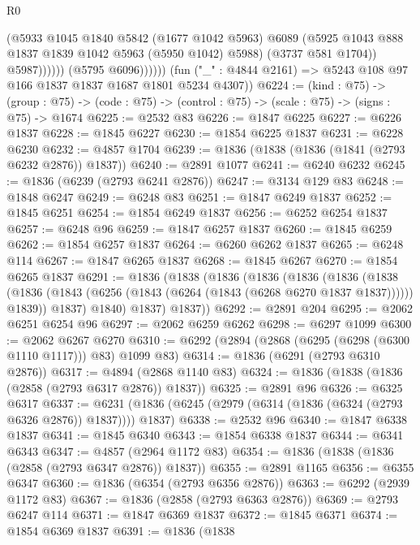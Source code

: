 \begin{lexlean}{R0}
\begin{coremodule}
                            (@5933
                              @1045
                              @1840
                              @5842
                              (@1677 @1042 @5963)
                              @6089
                              (@5925 @1043 @888 @1837 @1839 @1042 @5963 (@5950 @1042) @5988)
                              (@3737 @581 @1704))
                            @5987))))))
                (@5795 @6096))))))
      (fun ("_" : @4844 @2161) => @5243 @108 @97 @166 @1837 @1837 @1687 @1801 @5234 @4307))
@6224 := (kind : @75) ->
  (group : @75) -> (code : @75) -> (control : @75) -> (scale : @75) -> (signs : @75) -> @1674
@6225 := @2532 @83
@6226 := @1847 @6225
@6227 := @6226 @1837
@6228 := @1845 @6227
@6230 := @1854 @6225 @1837
@6231 := @6228 @6230
@6232 := @4857 @1704
@6239 := @1836 (@1838 (@1836 (@1841 (@2793 @6232 @2876)) @1837))
@6240 := @2891 @1077
@6241 := @6240 @6232
@6245 := @1836 (@6239 (@2793 @6241 @2876))
@6247 := @3134 @129 @83
@6248 := @1848 @6247
@6249 := @6248 @83
@6251 := @1847 @6249 @1837
@6252 := @1845 @6251
@6254 := @1854 @6249 @1837
@6256 := @6252 @6254 @1837
@6257 := @6248 @96
@6259 := @1847 @6257 @1837
@6260 := @1845 @6259
@6262 := @1854 @6257 @1837
@6264 := @6260 @6262 @1837
@6265 := @6248 @114
@6267 := @1847 @6265 @1837
@6268 := @1845 @6267
@6270 := @1854 @6265 @1837
@6291 := @1836
    (@1838
      (@1836
        (@1836
          (@1836
            (@1836
              (@1838
                (@1836 (@1843 (@6256 (@1843 (@6264 (@1843 (@6268 @6270 @1837 @1837)))))) @1839))
              @1837)
            @1840)
          @1837)
        @1837))
@6292 := @2891 @204
@6295 := @2062 @6251 @6254 @96
@6297 := @2062 @6259 @6262
@6298 := @6297 @1099
@6300 := @2062 @6267 @6270
@6310 := @6292 (@2894 (@2868 (@6295 (@6298 (@6300 @1110 @1117))) @83) @1099 @83)
@6314 := @1836 (@6291 (@2793 @6310 @2876))
@6317 := @4894 (@2868 @1140 @83)
@6324 := @1836 (@1838 (@1836 (@2858 (@2793 @6317 @2876)) @1837))
@6325 := @2891 @96
@6326 := @6325 @6317
@6337 := @6231 (@1836 (@6245 (@2979 (@6314 (@1836 (@6324 (@2793 @6326 @2876)) @1837)))) @1837)
@6338 := @2532 @96
@6340 := @1847 @6338 @1837
@6341 := @1845 @6340
@6343 := @1854 @6338 @1837
@6344 := @6341 @6343
@6347 := @4857 (@2964 @1172 @83)
@6354 := @1836 (@1838 (@1836 (@2858 (@2793 @6347 @2876)) @1837))
@6355 := @2891 @1165
@6356 := @6355 @6347
@6360 := @1836 (@6354 (@2793 @6356 @2876))
@6363 := @6292 (@2939 @1172 @83)
@6367 := @1836 (@2858 (@2793 @6363 @2876))
@6369 := @2793 @6247 @114
@6371 := @1847 @6369 @1837
@6372 := @1845 @6371
@6374 := @1854 @6369 @1837
@6391 := @1836
    (@1838

\end{coremodule}
\end{lexlean}
